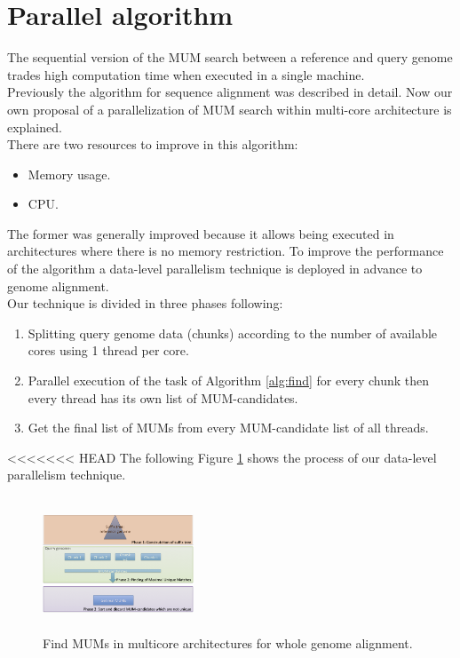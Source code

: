 \documentclass[3p,times]{elsarticle}
\begin{document}
\section{Parallel algorithm}  
The sequential version of the MUM search between a reference and query genome trades high computation time when executed in a single machine. \\
Previously the algorithm for sequence alignment was described in detail. Now our own proposal of a parallelization of MUM search within multi-core architecture is explained.\\
There are two resources to improve in this algorithm:
\begin{itemize}
\item Memory usage.
\item CPU.
\end{itemize}
The former was generally improved because it allows being executed in architectures where there is no memory restriction. To improve the performance of the algorithm a data-level parallelism technique is deployed in advance to genome alignment.\\
Our technique is divided in three phases following:
\begin{enumerate}
\item Splitting query genome data (chunks) according to the number of available cores using 1 thread per core.
\item Parallel execution of the task of Algorithm \ref{alg:find} for every chunk then every thread has its own list of MUM-candidates.
\item Get the final list of MUMs from every MUM-candidate list of all threads.
\end{enumerate}
<<<<<<< HEAD
The following Figure \ref{algorithm} shows the process of our data-level parallelism technique.
\begin{figure}[htb]  
\begin{center} 
  \includegraphics[width=4.5cm,height=4cm]{Phases.png}
\end{center} 
\caption{Find MUMs in multicore architectures for whole genome alignment.} 
\label{algorithm} 
\end{figure} 
\end{document}

